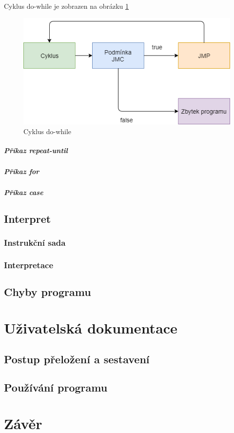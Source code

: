 \documentclass[
12pt,
a4paper,
pdftex,
czech,
titlepage
]{report}
\begin{document}
Cyklus do-while je zobrazen na obrázku \ref{doWhile}

\begin{figure}[h]
\caption{Cyklus do-while}
\label{doWhile}
\includegraphics[width=\textwidth]{doWhile.png}
\end{figure}

\paragraph{Příkaz repeat-until}

\paragraph{Příkaz for}

\paragraph{Příkaz case}

 
 \section{Interpret}
 
 \subsection{Instrukční sada}
 
 \subsection{Interpretace}
 
 \section{Chyby programu}

\chapter{Uživatelská dokumentace} 

\section{Postup přeložení a sestavení}

\section{Používání programu}

\chapter{Závěr}
\end{document}
